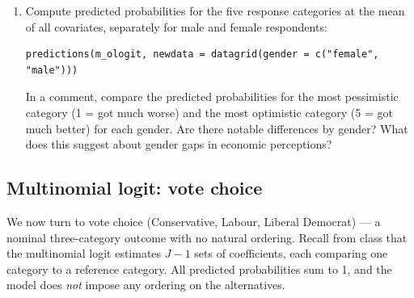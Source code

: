 \begin{enumerate}[label=\alph*)]
  \item Compute predicted probabilities for the five response categories at the mean of all covariates, separately for male and female respondents:
  \begin{lstlisting}
predictions(m_ologit, newdata = datagrid(gender = c("female", "male")))
  \end{lstlisting}
  In a comment, compare the predicted probabilities for the most pessimistic category (1 = got much worse) and the most optimistic category (5 = got much better) for each gender. Are there notable differences by gender? What does this suggest about gender gaps in economic perceptions?

\end{enumerate}

\subsection{Multinomial logit: vote choice}

We now turn to vote choice (Conservative, Labour, Liberal Democrat) --- a nominal three-category outcome with no natural ordering. Recall from class that the multinomial logit estimates $J - 1$ sets of coefficients, each comparing one category to a reference category. All predicted probabilities sum to 1, and the model does \textit{not} impose any ordering on the alternatives.

